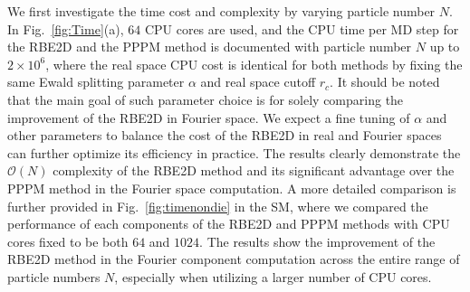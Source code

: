 We first investigate the time cost and complexity by varying particle number $N$. 
In Fig.~\ref{fig:Time}(a), $64$ CPU cores are used, and the  CPU time per MD step for the RBE2D  {and the PPPM method} is documented with particle number $N$ up to $2\times 10^6$, where  {the real space CPU cost is identical for both methods by fixing the same Ewald splitting parameter $\alpha$ and real space cutoff $r_c$}.
 {It should be noted that the main goal of such parameter choice is for solely comparing the improvement of the RBE2D in Fourier space. We expect a fine tuning of $\alpha$ and other parameters to balance the cost of the RBE2D in real and Fourier spaces can further optimize its efficiency in practice.}
The results clearly  {demonstrate} the $\mathcal{O}(N)$ complexity of the RBE2D method  {and its significant advantage over the PPPM method in the Fourier space computation.}
 {A more detailed comparison is further provided in Fig.~\ref{fig:timenondie} in the SM, where we compared the performance of each components of the RBE2D and PPPM methods with CPU cores fixed to be both $64$ and $1024$. The results show the improvement of the RBE2D method in the Fourier component computation across the entire range of particle numbers $N$, especially when utilizing a larger number of CPU cores.} %



